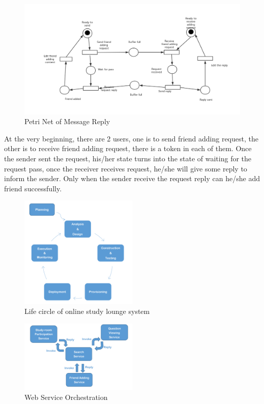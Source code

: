 \documentclass[runningheads]{llncs}
\begin{document}
\begin{figure}[H]
		\centering %
		\includegraphics[width=1.0\textwidth]{./figure/PMZ/pe} %
		\caption{Petri Net of Message Reply} %
		\label{pe} %
	\end{figure}
At the very beginning, there are 2 users, one is to send friend adding request, the other is to receive friend adding request, there is a token in each of them. Once the sender sent the request, his/her state turns into the state of waiting for the request pass, once the receiver receives request, he/she will give some reply to inform the sender. Only when the sender receive the request reply can he/she add friend successfully.
\begin{figure}[H]
		\centering %
		\includegraphics[width=0.5\textwidth]{./figure/PMZ/life} %
		\caption{Life circle of online study lounge system} %
		\label{life} %

	\end{figure}
\begin{figure}[H]
		\centering %
		\includegraphics[width=0.5\textwidth]{./figure/PMZ/WSO} %
		\caption{Web Service Orchestration} %
		\label{wso} %

	\end{figure}
\end{document}
